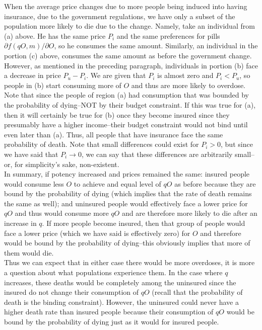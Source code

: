 \documentclass{article}
\begin{document}
When the average price changes due to more people being induced into having insurance, due to the government regulations, we have only a subset of the population more likely to die due to the change. Namely, take an individual from (a) above. He has the same price $P_i$ and the same preferences for pills $\partial f(qO,m)/ \partial O$, so he consumes the same amount. Similarly, an individual in the portion (c) above, consumes the same amount as before the government change. However, as mentioned in the preceding paragraph, individuals in portion (b) face a decrease in price $P_u - P_i$. We are given that $P_i$ is almost zero and $P_i<P_u$, so people in (b) start consuming more of $O$ and thus are more likely to overdose. Note that since the people of region (a) had consumption that was bounded by the probability of dying--NOT by their budget constraint. If this was true for (a), then it will certainly be true for (b) once they become insured since they presumably have a higher income--their budget constraint would not bind until even later than (a). Thus, all people that have insurance face the same probability of death. Note that small differences could exist for $P_i>0$, but since we have said that $P_i \to 0$, we can say that these differences are arbitrarily small--or, for simplicity's sake, non-existent.\\

In summary, if potency increased and prices remained the same: insured people would consume less $O$ to achieve and equal level of $qO$ as before because they are bound by the probability of dying (which implies that the rate of death remains the same as well); and uninsured people would effectively face a lower price for $qO$ and thus would consume more $qO$ and are therefore more likely to die after an increase in $q$. If more people become insured, then that group of people would face a lower price (which we have said is effectively zero) for $O$ and therefore would be bound by the probability of dying--this obviously implies that more of them would die.\\

Thus we can expect that in either case there would be more overdoses, it is more a question about what populations experience them. In the case where $q$ increases, these deaths would be completely among the uninsured since the insured do not change their consumption of $qO$ (recall that the probability of death is the binding constraint). However, the uninsured could never have a higher death rate than insured people because their consumption of $qO$ would be bound by the probability of dying just as it would for insured people.\\
\end{document}
